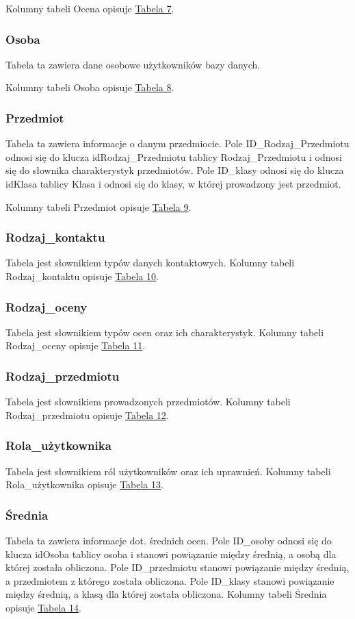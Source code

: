 \documentclass[10pt,a4paper,notitlepage]{article}
\begin{document}
Kolumny tabeli Ocena opisuje \hyperref[tab7]{Tabela 7}.
\subsubsection{Osoba}
Tabela ta zawiera dane osobowe użytkowników bazy danych.

Kolumny tabeli Osoba opisuje \hyperref[tab8]{Tabela 8}.
\subsubsection{Przedmiot}
Tabela ta zawiera informacje o danym przedmiocie.
Pole ID\_Rodzaj\_Przedmiotu odnosi się do klucza idRodzaj\_Przedmiotu tablicy Rodzaj\_Przedmiotu i odnosi się do słownika charakterystyk przedmiotów. Pole ID\_klasy odnosi się do klucza idKlasa tablicy Klasa i odnosi się do klasy, w której prowadzony jest przedmiot.

Kolumny tabeli Przedmiot opisuje \hyperref[tab9]{Tabela 9}.
\subsubsection{Rodzaj\_kontaktu}
Tabela jest słownikiem typów danych kontaktowych.
Kolumny tabeli Rodzaj\_kontaktu opisuje \hyperref[tab10]{Tabela 10}.
\subsubsection{Rodzaj\_oceny}
Tabela jest słownikiem typów ocen oraz ich charakterystyk.
Kolumny tabeli Rodzaj\_oceny opisuje \hyperref[tab11]{Tabela 11}.
\subsubsection{Rodzaj\_przedmiotu}
Tabela jest słownikiem prowadzonych przedmiotów.
Kolumny tabeli Rodzaj\_przedmiotu opisuje \hyperref[tab12]{Tabela 12}.
\subsubsection{Rola\_użytkownika}
Tabela jest słownikiem ról użytkowników oraz ich uprawnień.
Kolumny tabeli Rola\_użytkownika opisuje \hyperref[tab13]{Tabela 13}.
\subsubsection{Średnia}
Tabela ta zawiera informacje dot. średnich ocen. Pole ID\_osoby odnosi się do klucza idOsoba tablicy osoba i stanowi powiązanie między średnią, a osobą dla której została obliczona. Pole ID\_przedmiotu stanowi powiązanie między średnią, a przedmiotem z którego została obliczona. Pole ID\_klasy stanowi powiązanie między średnią, a klasą dla której została obliczona.
Kolumny tabeli Średnia opisuje \hyperref[tab14]{Tabela 14}.
\end{document}

